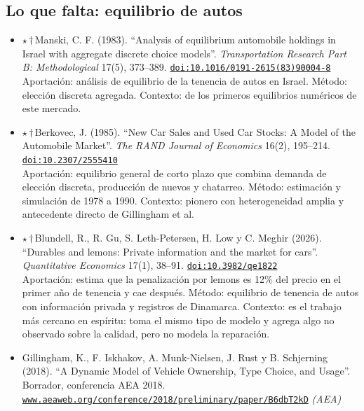 \documentclass[11pt]{article}
\begin{document}
\subsection*{Lo que falta: equilibrio de autos}
\begin{itemize}
\item $\star$\,$\dagger$\,Manski, C. F. (1983). ``Analysis of equilibrium automobile holdings in Israel with aggregate discrete choice models''. \textit{Transportation Research Part B: Methodological} 17(5), 373--389. \href{https://doi.org/10.1016/0191-2615(83)90004-8}{\texttt{doi:10.1016/0191-2615(83)90004-8}}\\
Aportación: análisis de equilibrio de la tenencia de autos en Israel. Método: elección discreta agregada. Contexto: de los primeros equilibrios numéricos de este mercado.
\item $\star$\,$\dagger$\,Berkovec, J. (1985). ``New Car Sales and Used Car Stocks: A Model of the Automobile Market''. \textit{The RAND Journal of Economics} 16(2), 195--214. \href{https://doi.org/10.2307/2555410}{\texttt{doi:10.2307/2555410}}\\
Aportación: equilibrio general de corto plazo que combina demanda de elección discreta, producción de nuevos y chatarreo. Método: estimación y simulación de 1978 a 1990. Contexto: pionero con heterogeneidad amplia y antecedente directo de Gillingham et al.
\item $\star$\,$\dagger$\,Blundell, R., R. Gu, S. Leth-Petersen, H. Low y C. Meghir (2026). ``Durables and lemons: Private information and the market for cars''. \textit{Quantitative Economics} 17(1), 38--91. \href{https://doi.org/10.3982/qe1822}{\texttt{doi:10.3982/qe1822}}\\
Aportación: estima que la penalización por lemons es 12\% del precio en el primer año de tenencia y cae después. Método: equilibrio de tenencia de autos con información privada y registros de Dinamarca. Contexto: es el trabajo más cercano en espíritu: toma el mismo tipo de modelo y agrega algo no observado sobre la calidad, pero no modela la reparación.
\item Gillingham, K., F. Iskhakov, A. Munk-Nielsen, J. Rust y B. Schjerning (2018). ``A Dynamic Model of Vehicle Ownership, Type Choice, and Usage''. Borrador, conferencia AEA 2018. \href{https://www.aeaweb.org/conference/2018/preliminary/paper/B6dbT2kD}{\texttt{www.aeaweb.org/conference/2018/preliminary/paper/B6dbT2kD}} \textit{(AEA)}\\

\end{itemize}
\end{document}
